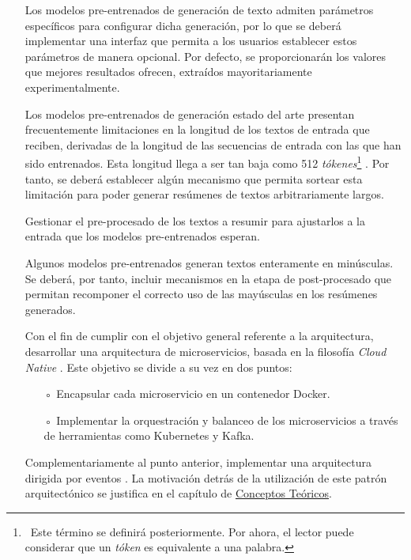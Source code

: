 \vspace{-0.2cm}
\begin{itemize}
	\item [\textbullet] Los modelos pre-entrenados de generación de texto admiten parámetros específicos para configurar dicha generación, por lo que se deberá implementar una interfaz que permita a los usuarios establecer estos parámetros de manera opcional. Por defecto, se proporcionarán los valores que mejores resultados ofrecen, extraídos mayoritariamente experimentalmente.
	
	\item [\textbullet] Los modelos pre-entrenados de generación estado del arte presentan frecuentemente limitaciones en la longitud de los textos de entrada que reciben, derivadas de la longitud de las secuencias de entrada con las que han sido entrenados. Esta longitud llega a ser tan baja como 512 \emph{tókenes}\footnote{\, Este término se definirá posteriormente. Por ahora, el lector puede considerar que un \emph{tóken} es equivalente a una palabra.} \cite{raffel19}. Por tanto, se deberá establecer algún mecanismo que permita sortear esta limitación para poder generar resúmenes de textos arbitrariamente largos.

	\item [\textbullet] Gestionar el pre-procesado de los textos a resumir para ajustarlos a la entrada que los modelos pre-entrenados esperan.

	\item [\textbullet] Algunos modelos pre-entrenados generan textos enteramente en minúsculas. Se deberá, por tanto, incluir mecanismos en la etapa de post-procesado que permitan recomponer el correcto uso de las mayúsculas en los resúmenes generados.

	\item [\textbullet] Con el fin de cumplir con el objetivo general referente a la arquitectura, desarrollar una arquitectura de microservicios, basada en la filosofía \emph{Cloud Native} \cite{cloud20, arundel19}. Este objetivo se divide a su vez en dos puntos:
	\begin{itemize}
		\item [◦] Encapsular cada microservicio en un contenedor Docker.
		\item [◦] Implementar la orquestración y balanceo de los microservicios a través de herramientas como Kubernetes y Kafka.
	\end{itemize}

	\item [\textbullet] Complementariamente al punto anterior, implementar una arquitectura dirigida por eventos \cite{bellemare20}. La motivación detrás de la utilización de este patrón arquitectónico se justifica en el capítulo de \hyperref[chapter:conceptos]{Conceptos Teóricos}.
	

\end{itemize}

